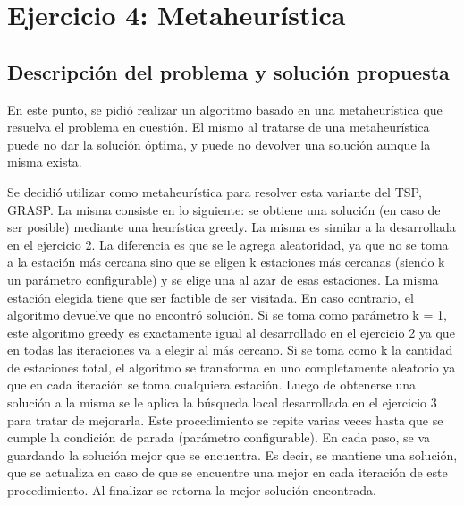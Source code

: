 \section{Ejercicio 4: Metaheurística}


    \subsection{Descripción del problema y solución propuesta}
        En este punto, se pidió realizar un algoritmo basado en una metaheurística que resuelva el problema en cuestión. El mismo al tratarse de una metaheurística puede no dar la solución óptima, y puede no devolver una solución aunque la misma exista.

        Se decidió utilizar como metaheurística para resolver esta variante del TSP, GRASP. La misma consiste en lo siguiente: se obtiene una solución (en caso de ser posible) mediante una heurística greedy. La misma es similar a la desarrollada en el ejercicio 2. La diferencia es que se le agrega aleatoridad, ya que no se toma a la estación más cercana sino que se eligen k estaciones más cercanas (siendo k un parámetro configurable) y se elige una al azar de esas estaciones. La misma estación elegida tiene que ser factible de ser visitada. En caso contrario, el algoritmo devuelve que no encontró solución. Si se toma como parámetro k = 1, este algoritmo greedy es exactamente igual al desarrollado en el ejercicio 2 ya que en todas las iteraciones va a elegir al más cercano. Si se toma como k la cantidad de estaciones total, el algoritmo se transforma en uno completamente aleatorio ya que en cada iteración se toma cualquiera estación. Luego de obtenerse una solución a la misma se le aplica la búsqueda local desarrollada en el ejercicio 3 para tratar de mejorarla. Este procedimiento se repite varias veces hasta que se cumple la condición de parada (parámetro configurable). En cada paso, se va guardando la solución mejor que se encuentra. Es decir, se mantiene una solución, que se actualiza en caso de que se encuentre una mejor en cada iteración de este procedimiento. Al finalizar se retorna la mejor solución encontrada.